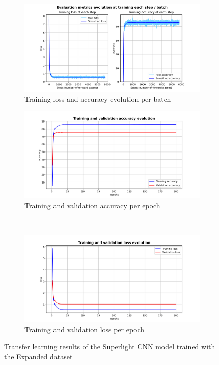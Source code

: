 \documentclass[11pt, a4paper]{article}
\numberwithin{equation}{subsection}
\begin{document}
\begin{figure}[h!]
  \centering
  \begin{subfigure}[b]{0.45\textwidth}
    \includegraphics[width=\textwidth]{images/tl_v4_loss_acc_per_batch.png}
    \caption{Training loss and accuracy evolution per batch}
    \label{fig:image1}
  \end{subfigure}
  \hspace{0\textwidth} %
  \begin{subfigure}[b]{0.45\textwidth}
    \includegraphics[width=\textwidth]{images/tl_v4_train_validation_accuracy.png}
    \caption{Training and validation accuracy per epoch}
    \label{fig:image2}
  \end{subfigure}\\[0.5ex] %
  \begin{subfigure}[b]{0.45\textwidth}
    \includegraphics[width=\textwidth]{images/tl_v4_train_validation_loss.png}
    \caption{Training and validation loss per epoch}
    \label{fig:image3}
  \end{subfigure}
  \caption{Transfer learning results of the Superlight CNN model trained with the Expanded dataset}
  \label{fig:three_images_2}
\end{figure}
\end{document}
